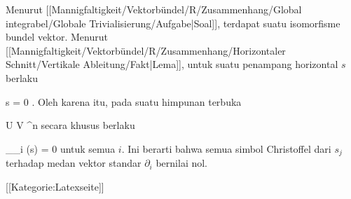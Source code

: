Menurut
[[Mannigfaltigkeit/Vektorbündel/R/Zusammenhang/Global integrabel/Globale Trivialisierung/Aufgabe|Soal]],
terdapat suatu isomorfisme bundel vektor. Menurut
[[Mannigfaltigkeit/Vektorbündel/R/Zusammenhang/Horizontaler Schnitt/Vertikale Ableitung/Fakt|Lema]],
untuk suatu penampang horizontal $s$ berlaku

\mavergleichskette
{\vergleichskette
{ \nabla s
}
{ = }{ 0
}
{  }{
}
{    }{
}
{   }{
}
}
{}{}{.}
Oleh karena itu, pada suatu himpunan terbuka

\mavergleichskette
{\vergleichskette
{ U
}
{ \cong }{ V
}
{ \subseteq }{  \R^n
}
{    }{
}
{   }{
}
}
{}{}{}
secara khusus berlaku

\mavergleichskettedisp
{\vergleichskette
{ \nabla_{\partial_i} (s)
}
{ =} { 0
}
{ } {
}
{ } {
}
{ } {
}
}
{}{}{}
untuk semua $i$. Ini berarti bahwa semua simbol Christoffel dari
$s_j$ terhadap medan vektor standar $\partial_i$ bernilai nol.

 [[Kategorie:Latexseite]]
